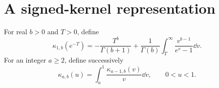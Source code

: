 \section{A signed-kernel representation}
\label{signed:sec:kernel}

\begin{definition}\label{signed:def:kappa}
For real $b>0$ and $T>0$, define
\begin{equation}\label{signed:eq:kappa-base}
 \kappa_{1,b}(e^{-T})=
 -\frac{T^b}{\Gamma(b+1)}
 +\frac1{\Gamma(b)}\int_T^\infty\frac{v^{b-1}}{e^v-1}\dd v.
\end{equation}
For an integer $a\ge2$, define successively
\begin{equation}\label{signed:eq:kappa-recursion}
 \kappa_{a,b}(u)=\int_u^1\frac{\kappa_{a-1,b}(v)}{v}\dd v,
 \qquad 0<u<1.
\end{equation}
\end{definition}

